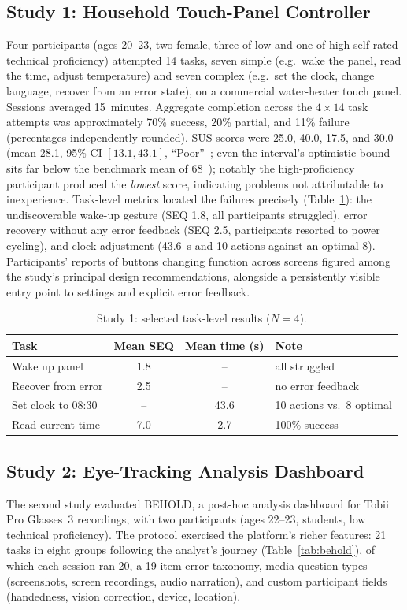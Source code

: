 \documentclass[conference]{IEEEtran}
\begin{document}
\subsection{Study 1: Household Touch-Panel Controller}
Four participants (ages 20--23, two female, three of low and one of high
self-rated technical proficiency) attempted 14 tasks, seven simple
(e.g.\ wake the panel, read the time, adjust temperature) and seven
complex (e.g.\ set the clock, change language, recover from an error
state), on a commercial water-heater touch panel. Sessions averaged
15~minutes. Aggregate completion across the $4\times14$ task attempts was
approximately 70\% success, 20\% partial, and 11\% failure (percentages
independently rounded). SUS scores were 25.0, 40.0, 17.5, and 30.0 (mean 28.1,
95\% CI $[13.1, 43.1]$, ``Poor''~\cite{bangor2009determining}; even the
interval's optimistic bound sits far below the benchmark mean of
68~\cite{sauro2011practical}); notably the high-proficiency participant
produced the \emph{lowest} score, indicating problems not attributable to
inexperience. Task-level metrics located the failures precisely
(Table~\ref{tab:bosch}): the undiscoverable wake-up gesture (SEQ 1.8, all
participants struggled), error recovery without any error feedback (SEQ
2.5, participants resorted to power cycling), and clock adjustment
(43.6~s and 10 actions against an optimal 8). Participants' reports of
buttons changing function across screens figured among the study's
principal design recommendations, alongside a persistently visible entry
point to settings and explicit error feedback.

\begin{table}[t]
\caption{Study 1: selected task-level results ($N{=}4$).}
\label{tab:bosch}
\centering
\footnotesize
\setlength{\tabcolsep}{4pt}
\begin{tabular}{@{}lccl@{}}
\toprule
Task & Mean SEQ & Mean time (s) & Note\\
\midrule
Wake up panel & 1.8 & -- & all struggled\\
Recover from error & 2.5 & -- & no error feedback\\
Set clock to 08:30 & -- & 43.6 & 10 actions vs.\ 8 optimal\\
Read current time & 7.0 & 2.7 & 100\% success\\
\bottomrule
\end{tabular}
\end{table}

\subsection{Study 2: Eye-Tracking Analysis Dashboard}
The second study evaluated BEHOLD, a post-hoc analysis dashboard for
Tobii Pro Glasses~3 recordings, with two participants (ages 22--23,
students, low technical proficiency). The protocol exercised the
platform's richer features: 21 tasks in eight groups following the
analyst's journey (Table~\ref{tab:behold}), of which each session ran
20, a 19-item error taxonomy, media question types (screenshots, screen
recordings, audio narration), and custom participant fields (handedness,
vision correction, device, location).
\end{document}
